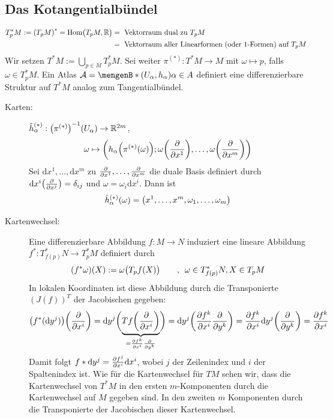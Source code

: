 \subsection{Das Kotangentialbündel} %
\label{sub:42}
\begin{align*}
	T_p^* M := \enbrace*{T_pM}^* = \Hom\enbrace[\big]{T_pM, \mathds{R}} &= \text{ Vektorraum dual zu } T_p M  \\
	&= \text{ Vektorraum aller Linearformen (oder 1-Formen) auf } T_pM
\end{align*}
Wir setzen $T^*M := \bigcup_{p \in M} T_p^* M$. Sei weiter $\pi^{(*)} : T^*M \to M$ mit $\omega \mapsto p$, falls $\omega \in T_p^* M$. Ein Atlas 
$\mathcal{A} = \set[(U_\alpha, h_\alpha)]{\alpha \in A}$ definiert eine differenzierbare Struktur auf $T^*M$ analog zum Tangentialbündel.
\begin{description}
	\item[Karten:] $\tilde{h}^{(*)}_\alpha : \enbrace*{\pi^{(*)}} ^{-1} (U_\alpha) \to \mathds{R}^{2m}$, 
	\[
		\omega \mapsto \enbrace*{h_\alpha \enbrace*{\pi^{(*)}(\omega)}; \omega \enbrace*{\diff{}{x^1}}, \ldots , \omega \enbrace*{\diff{}{x^m} }   } 
	\]
	Sei $\mathrm{d}x^1, \ldots , \mathrm{d}x^m$ zu $\diff{}{x^1}, \ldots , \diff{}{x^m}$ die duale Basis definiert durch 
	$\mathrm{d}x^i \enbrace*{\diff{}{x^j} } = \delta_{ij} $ und $\omega= \omega_i \mathrm{d}x^i$. Dann ist
	\[
		\tilde{h}_\alpha^{(*)} (\omega) = \enbrace*{x^1, \ldots, x^m, \omega_1, \ldots , \omega_m} 
	\]
	\item[Kartenwechsel:] Eine differenzierbare Abbildung $f : M \to N$ induziert eine lineare Abbildung $f^* : T^*_{f(p)}N \to T^*_pM$ definiert durch 
	\[
		(f^* \omega)(X) := \omega \enbrace[\big]{T_p f(X)} \qquad , \enspace \omega \in T_{f(p)}^*N, X \in T_pM
	\]
	In lokalen Koordinaten ist diese Abbildung durch die Transponierte $(J(f))^T$ der Jacobischen gegeben:
	\begin{align*}
		\enbrace*{f^*(\mathrm{d}y^j)} \enbrace*{\diff{}{x^i} } = \mathrm{d}y^j \enbrace[\bigg]{\underbrace{T f \enbrace*{\diff{}{x^i} }}_{= \diff{f^k}{x^i} \diff{}{y^k}} } 
		= \mathrm{d}y^j \enbrace*{\diff{f^k}{x^i} \diff{}{y^k}} = \diff{f^k}{x^i} \mathrm{d}y^j \enbrace*{\diff{}{y^k} } = \diff{f^k}{x^i}    
	\end{align*}
	Damit folgt $f* \mathrm{d}y^j = \diff{f^j}{x^i} \mathrm{d} x^i $, wobei $j$ der Zeilenindex und $i$ der Spaltenindex ist. Wie für die Kartenwechsel für $TM$ sehen wir,
	dass die Kartenwechsel von $T^*M$ in den ersten $m$-Komponenten durch die Kartenwechsel auf $M$ gegeben sind. In den zweiten $m$ Komponenten durch die Transponierte 
	der Jacobischen dieser Kartenwechsel. 
\end{description}

